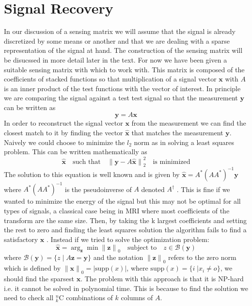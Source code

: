 \documentclass[11pt,twoside,a4paper]{article}
\newcommand{\supp}{\text{supp}}
\begin{document}
\section{Signal Recovery}\label{recovery}
In our discussion of a sensing matrix we will assume that the signal is already discretized by some means or another and that we are dealing with a sparse representation of the signal at hand. The construction of the sensing matrix will be disucssed in more detail later in the text. For now we have been given a suitable sensing matrix with which to work with. This matrix is composed of the coefficients of stacked functions so that multiplication of a signal vector $\mathbf{x}$ with $A$ is an inner product of the test functions with the vector of interest. In principle we are comparing the signal against a test test signal so that the measurement $\mathbf{y}$ can be written as
	\begin{equation*}
		\mathbf{y}=A\mathbf{x}
	\end{equation*}
In order to reconstruct the signal vector $\mathbf{x}$ from the measurement we can find the closest match to it by finding the vector $\hat{\mathbf{x}}$ that matches the measurement $\mathbf{y}$. Naively we could choose to minimize the $l_2$ norm as in solving a least squares problem. This can be written mathematically as
	\begin{equation}
	\hat{\mathbf{x}} \quad \text{such that} \quad {\lVert \mathbf{y}-A\hat{\mathbf{x}} \rVert}_2^2 \quad \text{is minimized}
	\end{equation}
The solution to this equation is well known and is given by $\hat{\mathbf{x}}=A^*(AA^*)^{-1}\mathbf{y}$
where $A^*(AA^*)^{-1}$ is the pseudoinverse of $A$ denoted $A^{\dagger}$ \cite{LT}. This is fine if we wanted to minimize the energy of the signal but this may not be optimal for all types of signals, a classical case being in MRI where most coefficients of the transform are the same size. Then, by taking the k largest coefficients and setting the rest to zero and finding the least squares solution the algorithm fails to find a satisfactory $\mathbf{x}$ \cite{TT}. Instead if we tried to solve the optimization problem:\\
\begin{equation}
	\hat{\mathbf{x}}=\arg_{\mathbf{z}} \min { \lVert \mathbf{z} \rVert}_0  \quad \text{subject to}   \quad z  \in   \mathcal{B}(\mathbf{y})\label{sparseeq}
\end{equation}
where $\mathcal{B}(\mathbf{y})=\{z\;\vert\;A\mathbf{z}=\mathbf{y}\}$ and the notation ${\lVert \mathbf{z} \rVert}_0$ refers to the zero norm which is defined by ${\lVert \mathbf{x} \rVert}_0=\lvert \supp(x) \rvert$, where $\supp(x)=\{i\;\vert x_i\neq o\}$, we should find the sparsest $\mathbf{x}$. The problem with this approach is that it is NP-hard i.e. it cannot be solved in polynomial time. This is because to find the solution we need to check all ${}^{n}_{k}\text{C}$ combinations of $k$ columns of $A$.
\end{document}
